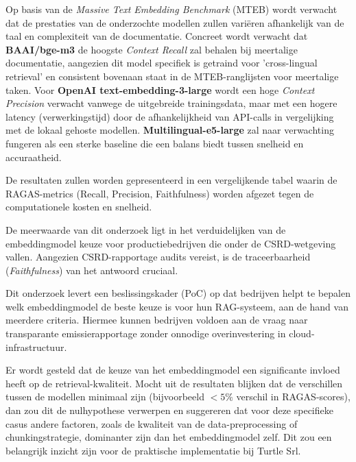 Op basis van de \textit{Massive Text Embedding Benchmark} (MTEB) wordt verwacht dat de prestaties van de onderzochte modellen zullen variëren afhankelijk van de taal en complexiteit van de documentatie. Concreet wordt verwacht dat \textbf{BAAI/bge-m3} de hoogste \textit{Context Recall} zal behalen bij meertalige documentatie, aangezien dit model specifiek is getraind voor 'cross-lingual retrieval' en consistent bovenaan staat in de MTEB-ranglijsten voor meertalige taken. Voor \textbf{OpenAI text-embedding-3-large} wordt een hoge \textit{Context Precision} verwacht vanwege de uitgebreide trainingsdata, maar met een hogere latency (verwerkingstijd) door de afhankelijkheid van API-calls in vergelijking met de lokaal gehoste modellen. \textbf{Multilingual-e5-large} zal naar verwachting fungeren als een sterke baseline die een balans biedt tussen snelheid en accuraatheid.

De resultaten zullen worden gepresenteerd in een vergelijkende tabel waarin de RAGAS-metrics (Recall, Precision, Faithfulness) worden afgezet tegen de computationele kosten en snelheid.

De meerwaarde van dit onderzoek ligt in het verduidelijken van de embeddingmodel keuze voor productiebedrijven die onder de CSRD-wetgeving vallen. Aangezien CSRD-rapportage audits vereist, is de traceerbaarheid (\textit{Faithfulness}) van het antwoord cruciaal.

Dit onderzoek levert een beslissingskader (PoC) op dat bedrijven helpt te bepalen welk embeddingmodel de beste keuze is voor hun RAG-systeem, aan de hand van meerdere criteria. Hiermee kunnen bedrijven voldoen aan de vraag naar transparante emissierapportage zonder onnodige overinvestering in cloud-infrastructuur. 

Er wordt gesteld dat de keuze van het embeddingmodel een significante invloed heeft op de retrieval-kwaliteit. Mocht uit de resultaten blijken dat de verschillen tussen de modellen minimaal zijn (bijvoorbeeld $<5\%$ verschil in RAGAS-scores), dan zou dit de nulhypothese verwerpen en suggereren dat voor deze specifieke casus andere factoren, zoals de kwaliteit van de data-preprocessing of chunkingstrategie, dominanter zijn dan het embeddingmodel zelf. Dit zou een belangrijk inzicht zijn voor de praktische implementatie bij Turtle Srl.